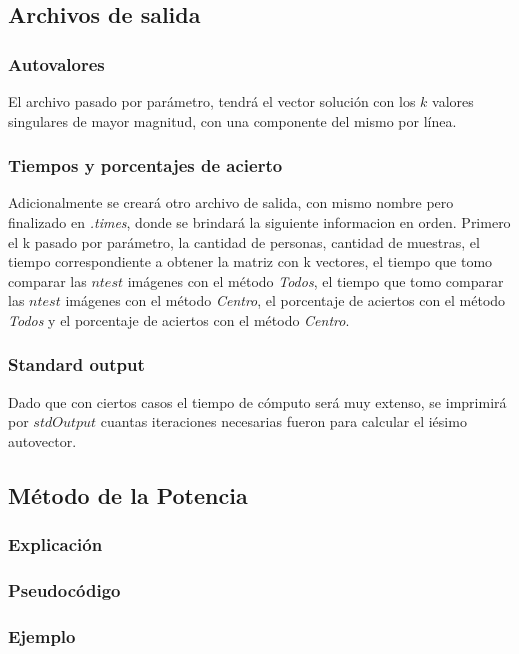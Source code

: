 \subsection{Archivos de salida}
\subsubsection{Autovalores}
El archivo pasado por par\'ametro, tendr\'a el vector soluci\'on con los $k$ valores singulares de mayor magnitud, con una
componente del mismo por l\'inea.

\subsubsection{Tiempos y porcentajes de acierto}
Adicionalmente se crear\'a otro archivo de salida, con mismo nombre pero finalizado en \emph{.times}, donde se brindar\'a la siguiente informacion en orden. Primero el k pasado por par\'ametro, la cantidad de personas, cantidad de muestras, el tiempo correspondiente a obtener la matriz con k vectores, el tiempo que tomo comparar las $ntest$ im\'agenes con el m\'etodo \emph{Todos}, el tiempo que tomo comparar las $ntest$ im\'agenes con el m\'etodo \emph{Centro}, el porcentaje de aciertos con el m\'etodo \emph{Todos} y el porcentaje de aciertos con el m\'etodo \emph{Centro}.

\subsubsection{Standard output}
Dado que con ciertos casos el tiempo de c\'omputo ser\'a muy extenso, se imprimir\'a por $stdOutput$ cuantas iteraciones necesarias fueron para calcular el i\'esimo autovector.

\subsection{M\'etodo de la Potencia}

  \subsubsection{Explicaci\'on}
  
  \subsubsection{Pseudoc\'odigo}
  
  \subsubsection{Ejemplo}
  

